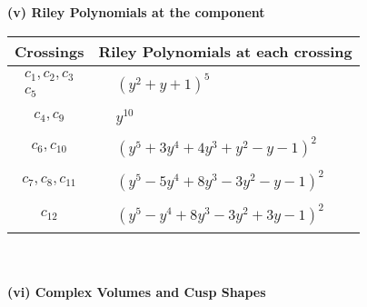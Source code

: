 \documentclass[1p]{elsarticle_modified}
\theoremstyle{definition}
\begin{document}
\newpage\renewcommand{\arraystretch}{1}
\flushleft \textbf{(v) Riley Polynomials at the component}\newline \\
\begin{tabular}{m{50pt}|m{274pt}}
Crossings & \hspace{64pt}Riley Polynomials at each crossing \\
\hline $$\begin{aligned}c_{1},c_{2},c_{3}\\c_{5}\end{aligned}$$&$\begin{aligned}
&(y^2+y+1)^5
\end{aligned}$\\
\hline $$\begin{aligned}c_{4},c_{9}\end{aligned}$$&$\begin{aligned}
&y^{10}
\end{aligned}$\\
\hline $$\begin{aligned}c_{6},c_{10}\end{aligned}$$&$\begin{aligned}
&(y^5+3 y^4+4 y^3+y^2- y-1)^2
\end{aligned}$\\
\hline $$\begin{aligned}c_{7},c_{8},c_{11}\end{aligned}$$&$\begin{aligned}
&(y^5-5 y^4+8 y^3-3 y^2- y-1)^2
\end{aligned}$\\
\hline $$\begin{aligned}c_{12}\end{aligned}$$&$\begin{aligned}
&(y^5- y^4+8 y^3-3 y^2+3 y-1)^2
\end{aligned}$\\
\hline
\end{tabular}\\~\\
\newpage\flushleft \textbf{(vi) Complex Volumes and Cusp Shapes}
\end{document}
